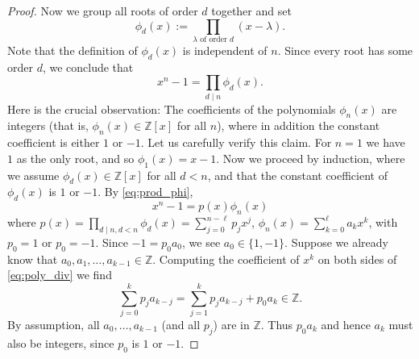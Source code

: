 \begin{proof}
  Now we group all roots of order $d$ together and set
  \[
  \phi_d(x) := \prod_{\lambda \text{ of order } d} (x - \lambda).
  \]
  Note that the definition of $\phi_d(x)$ is independent of $n$.
  Since every root has some order $d$, we conclude that
  \begin{equation} \label{eq:prod_phi}
  x^n - 1 = \prod_{d \mid n} \phi_d(x).
  \end{equation}
  Here is the crucial observation:
  The coefficients of the polynomials $\phi_n(x)$ are integers (that is, $\phi_n(x) \in \mathbb{Z}[x]$ for all $n$),
  where in addition the constant coefficient is either $1$ or $-1$.
  Let us carefully verify this claim.
  For $n = 1$ we have $1$ as the only root, and so $\phi_1(x) = x - 1$.
  Now we proceed by induction, where we assume $\phi_d(x) \in \mathbb{Z}[x]$ for all $d < n$,
  and that the constant coefficient of $\phi_d(x)$ is $1$ or $-1$.
  By \eqref{eq:prod_phi},
  \begin{equation} \label{eq:poly_div}
  x^n - 1 = p(x) \phi_n(x)
  \end{equation}
  where $p(x) = \prod_{d \mid n, d < n} \phi_d(x) = \sum_{j=0}^{n-\ell} p_j x^j$, $\phi_n(x) = \sum_{k=0}^{\ell} a_k x^k$, with $p_0 = 1$ or $p_0 = -1$.
  Since $-1 = p_0 a_0$, we see $a_0 \in \{1, -1\}$.
  Suppose we already know that $a_0, a_1, \dots, a_{k-1} \in \mathbb{Z}$.
  Computing the coefficient of $x^k$ on both sides of \eqref{eq:poly_div} we find
  \[
  \sum_{j=0}^k p_j a_{k-j} = \sum_{j=1}^k p_j a_{k-j} + p_0 a_k \in \mathbb{Z}.
  \]
  By assumption, all $a_0, \dots, a_{k-1}$ (and all $p_j$) are in $\mathbb{Z}$.
  Thus $p_0 a_k$ and hence $a_k$ must also be integers, since $p_0$ is $1$ or $-1$.
  

\end{proof}
